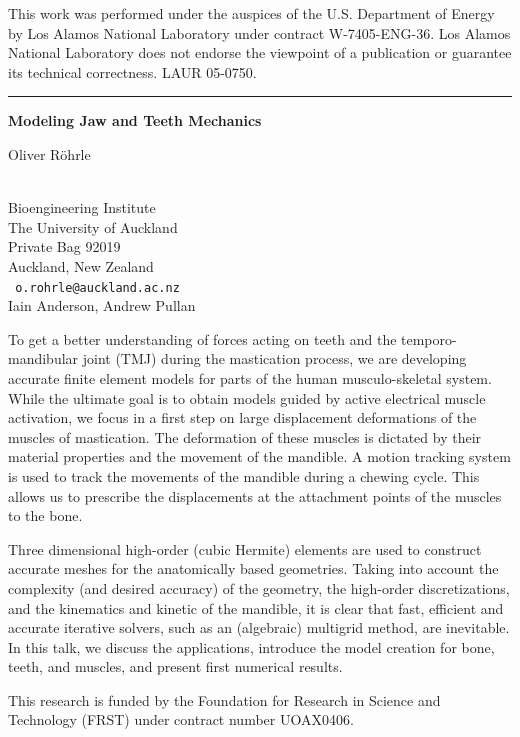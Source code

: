 \documentclass[twosided]{report}
\begin{document}
This work was performed under the auspices of the U.S. Department of
Energy by Los Alamos National Laboratory under contract W-7405-ENG-36.
Los Alamos National Laboratory does not endorse the viewpoint of a
publication or guarantee its technical correctness. LAUR 05-0750.

\begin{center}

\rule{6in}{1pt}
\end{center}

\begin{center}
{\large			\label{rohrle}
{\bf
Modeling Jaw and Teeth Mechanics
}

Oliver R\"{o}hrle} \\
Bioengineering Institute \\
The University of Auckland \\
Private Bag 92019 \\
Auckland, New Zealand
\\ {\tt
o.rohrle@auckland.ac.nz
}
\\

Iain Anderson,
Andrew Pullan
\end{center}


To get a better understanding of forces acting on teeth and the
temporo-mandibular joint (TMJ) during the mastication process, we are
developing accurate finite element models for parts of the human
musculo-skeletal system. While the ultimate goal is to obtain models
guided by active electrical muscle activation, we focus in a first step
on large displacement deformations of the muscles of mastication. The
deformation of these muscles is dictated by their material properties
and the movement of the mandible. A motion tracking system is used to
track the movements of the mandible during a chewing cycle. This allows
us to prescribe the displacements at the attachment points of the
muscles to the bone.

Three dimensional high-order (cubic Hermite) elements are used to
construct accurate meshes for the anatomically based geometries. Taking
into account the complexity (and desired accuracy) of the geometry, the
high-order discretizations, and the kinematics and kinetic of the
mandible, it is clear that fast, efficient and accurate iterative
solvers, such as an (algebraic) multigrid method, are inevitable. In
this talk, we discuss the applications, introduce the model creation
for bone, teeth, and muscles, and present first numerical results.

This research is funded by the Foundation for Research in Science and
Technology (FRST) under contract number UOAX0406.
\end{document}
